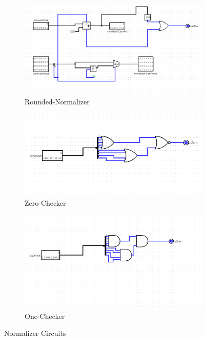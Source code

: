 \documentclass{article}
\begin{document}
\begin{figure}[h!]
    \begin{subfigure}[b]{0.3\textwidth}
        \includegraphics[width=\textwidth]{rounded_normalizer.png}
        \caption{Rounded-Normalizer}
    \end{subfigure}
    \begin{subfigure}[b]{0.3\textwidth}
        \includegraphics[width=\textwidth]{zero_checker.png}
        \caption{Zero-Checker}
    \end{subfigure}
    \begin{subfigure}[b]{0.3\textwidth}
        \includegraphics[width=\textwidth]{one_checker.png}
        \caption{One-Checker}
    \end{subfigure}
    
    \caption{Normalizer Circuits}
    \label{fig:normalizer_circuits}
\end{figure}
\end{document}
